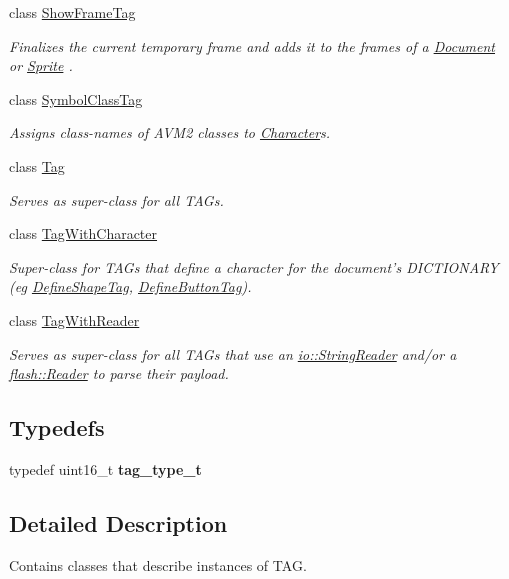 \begin{DoxyCompactItemize}
class \hyperlink{classjswf_1_1flash_1_1tags_1_1_show_frame_tag}{Show\+Frame\+Tag}
\begin{DoxyCompactList}\small\item\em Finalizes the current temporary frame and adds it to the {\ttfamily frames} of a \hyperlink{classjswf_1_1flash_1_1_document}{Document} or \hyperlink{classjswf_1_1flash_1_1_sprite}{Sprite} . \end{DoxyCompactList}\item 
class \hyperlink{classjswf_1_1flash_1_1tags_1_1_symbol_class_tag}{Symbol\+Class\+Tag}
\begin{DoxyCompactList}\small\item\em Assigns class-\/names of A\+V\+M2 classes to {\ttfamily \hyperlink{classjswf_1_1flash_1_1_character}{Character}}s. \end{DoxyCompactList}\item 
class \hyperlink{classjswf_1_1flash_1_1tags_1_1_tag}{Tag}
\begin{DoxyCompactList}\small\item\em Serves as super-\/class for all {\ttfamily T\+A\+G}s. \end{DoxyCompactList}\item 
class \hyperlink{classjswf_1_1flash_1_1tags_1_1_tag_with_character}{Tag\+With\+Character}
\begin{DoxyCompactList}\small\item\em Super-\/class for {\ttfamily T\+A\+G}s that define a character for the document's {\ttfamily D\+I\+C\+T\+I\+O\+N\+A\+R\+Y} (eg \hyperlink{classjswf_1_1flash_1_1tags_1_1_define_shape_tag}{Define\+Shape\+Tag}, \hyperlink{classjswf_1_1flash_1_1tags_1_1_define_button_tag}{Define\+Button\+Tag}). \end{DoxyCompactList}\item 
class \hyperlink{classjswf_1_1flash_1_1tags_1_1_tag_with_reader}{Tag\+With\+Reader}
\begin{DoxyCompactList}\small\item\em Serves as super-\/class for all {\ttfamily T\+A\+G}s that use an \hyperlink{classjswf_1_1io_1_1_string_reader}{io\+::\+String\+Reader} and/or a \hyperlink{classjswf_1_1flash_1_1_reader}{flash\+::\+Reader} to parse their payload. \end{DoxyCompactList}\end{DoxyCompactItemize}
\subsection*{Typedefs}
\begin{DoxyCompactItemize}
\item 
\hypertarget{namespacejswf_1_1flash_1_1tags_a058b96e966f434432b562ef46e1ce794}{typedef uint16\+\_\+t {\bfseries tag\+\_\+type\+\_\+t}}\label{namespacejswf_1_1flash_1_1tags_a058b96e966f434432b562ef46e1ce794}

\end{DoxyCompactItemize}


\subsection{Detailed Description}
Contains classes that describe instances of {\ttfamily T\+A\+G}. 